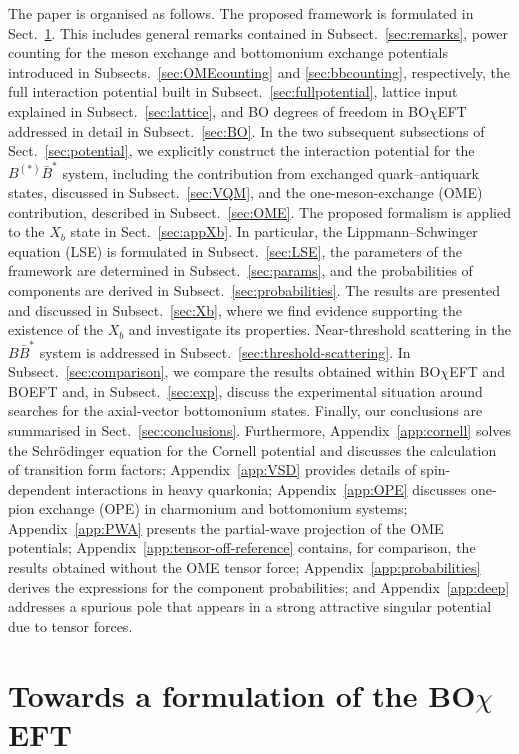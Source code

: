 \documentclass[aps,prd,showpacs,amsmath,twocolumn,superscriptaddress,floatfix,nofootinbib,notitlepage]{revtex4-2}
\newcommand{\Xb}{X_b}
\newcommand{\BOchiEFT}{BO$\chi$EFT\xspace}
\begin{document}
The paper is organised as follows.
The proposed framework is formulated in Sect.~\ref{sec:formulation}. This includes general remarks contained in Subsect.~\ref{sec:remarks}, power counting for the meson exchange and bottomonium exchange potentials introduced in Subsects.~\ref{sec:OMEcounting} and 
\ref{sec:bbcounting}, respectively, the full interaction potential built in Subsect.~\ref{sec:fullpotential}, lattice input explained in Subsect.~\ref{sec:lattice},
and BO degrees of freedom in \BOchiEFT addressed in detail in Subsect.~\ref{sec:BO}. In the two subsequent subsections of Sect.~\ref{sec:potential}, we explicitly construct the interaction potential for the $B^{(*)}\bar{B}^*$ system, including the contribution from exchanged quark--antiquark states, discussed in Subsect.~\ref{sec:VQM}, and the one-meson-exchange (OME) contribution, described in Subsect.~\ref{sec:OME}. 
The proposed formalism is applied to the 
$\Xb$ state in Sect.~\ref{sec:appXb}. In particular, the Lippmann--Schwinger equation (LSE) is formulated in Subsect.~\ref{sec:LSE}, the parameters of the framework are determined in Subsect.~\ref{sec:params}, and the probabilities of components are derived in Subsect.~\ref{sec:probabilities}. The results are presented and discussed in Subsect.~\ref{sec:Xb}, where we find evidence supporting the existence of the $\Xb$ and investigate its properties. 
Near-threshold scattering in the $B\bar{B}^*$ system is addressed in Subsect.~\ref{sec:threshold-scattering}. 
In Subsect.~\ref{sec:comparison}, we compare the results obtained within \BOchiEFT and BOEFT and, in Subsect.~\ref{sec:exp}, discuss the experimental situation around searches for the axial-vector bottomonium states. Finally, our conclusions are summarised in Sect.~\ref{sec:conclusions}.
Furthermore, Appendix~\ref{app:cornell} solves the Schr{\"o}dinger equation for the Cornell potential and discusses the calculation of transition form factors; Appendix~\ref{app:VSD} provides details of spin-dependent interactions in heavy quarkonia; Appendix~\ref{app:OPE} discusses one-pion exchange (OPE) in charmonium and bottomonium systems; Appendix~\ref{app:PWA} presents the partial-wave projection of the OME potentials; Appendix~\ref{app:tensor-off-reference} contains, for comparison, the results obtained without the OME tensor force; Appendix~\ref{app:probabilities} derives the expressions for the component probabilities; and Appendix~\ref{app:deep} addresses a spurious pole that appears in a strong attractive singular potential due to tensor forces.

\section{Towards a formulation of the \BOchiEFT}
\label{sec:formulation}
\end{document}
